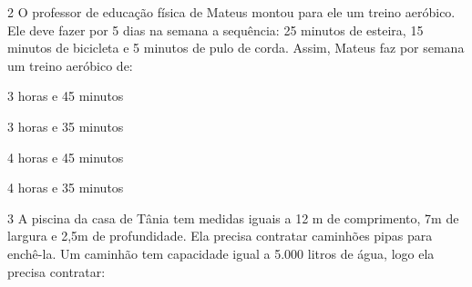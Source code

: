 
\num{2} O professor de educação física de Mateus montou para ele um treino
aeróbico. Ele deve fazer por 5 dias na semana a sequência: 25 minutos de
esteira, 15 minutos de bicicleta e 5 minutos de pulo de corda. Assim,
Mateus faz por semana um treino aeróbico de:

\begin{multicols}{2}
\begin{escolha}[itemsep=0pt]
\item 3 horas e 45 minutos
\item 3 horas e 35 minutos
\item 4 horas e 45 minutos
\item 4 horas e 35 minutos
\end{escolha}
\end{multicols}



\num{3} A piscina da casa de Tânia tem medidas iguais a 12 m de comprimento,
7m de largura e 2,5m de profundidade. Ela precisa contratar caminhões
pipas para enchê-la. Um caminhão tem capacidade igual a 5.000 litros de
água, logo ela precisa contratar:

